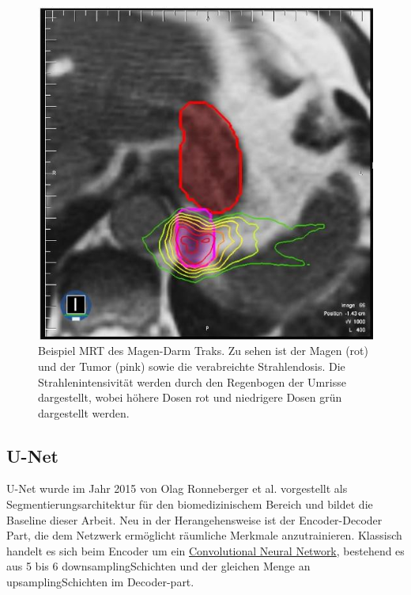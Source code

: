 \begin{figure}[htb]
	\begin{center}
		\includegraphics[width=450pt]{bilder/magen-mrt}
		\caption{Beispiel MRT des Magen-Darm Traks. Zu sehen ist der Magen (rot) und der Tumor (pink) sowie die verabreichte Strahlendosis. Die Strahlenintensivität werden durch den Regenbogen der Umrisse dargestellt, wobei höhere Dosen rot und niedrigere Dosen grün dargestellt werden.}\label{magen-mrt}
	\end{center}
\end{figure}

\subsection{U-Net}

U-Net wurde im Jahr 2015 von Olag Ronneberger et al. \citep{U-Net} vorgestellt als Segmentierungsarchitektur für den biomedizinischem Bereich und bildet die Baseline dieser Arbeit. Neu in der Herangehensweise ist der Encoder-Decoder Part, die dem Netzwerk ermöglicht räumliche Merkmale anzutrainieren.
Klassisch handelt es sich beim Encoder um ein
\href{https://en.wikipedia.org/wiki/Convolutional_neural_network}{Convolutional Neural Network}, bestehend es aus 5 bis 6 \glqq downsampling\grqq Schichten und der gleichen Menge an \glqq upsampling\grqq Schichten im Decoder-part. 

